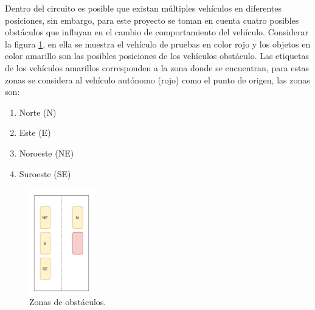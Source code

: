 Dentro del circuito es posible que existan múltiples vehículos en diferentes posiciones, sin embargo, para este proyecto se toman en cuenta cuatro posibles obstáculos que influyan en el cambio de comportamiento del vehículo. Considerar la figura \ref{fig:obstacle_zones}, en ella se muestra el vehículo de pruebas en color rojo y los objetos en color amarillo son las posibles posiciones de los vehículos obstáculo. Las etiquetas de los vehículos amarillos corresponden a la zona donde se encuentran, para estas zonas se considera al vehículo autónomo (rojo) como el punto de origen,  las zonas son:
\begin{enumerate}
    \item Norte (N)
    \item Este  (E)
    \item Noroeste (NE)
    \item Suroeste (SE)
\end{enumerate}

\begin{figure}[h]
    \centering
    \includegraphics[width=0.25\textwidth]{Figures/Figures_Cap06/zones.pdf}
    \caption{Zonas de obstáculos.}
    \label{fig:obstacle_zones}
\end{figure}

